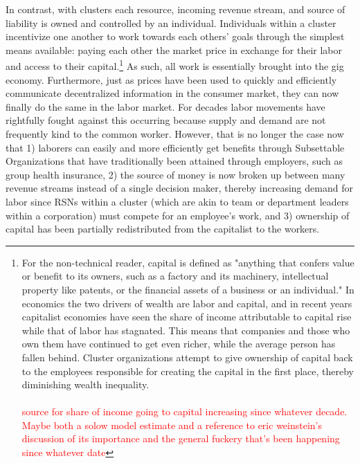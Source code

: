 \documentclass{article}[10pt]
\begin{document}
In contrast, with clusters each resource, incoming revenue stream, and source of liability is owned and controlled by an individual.
Individuals within a cluster incentivize one another to work towards each others' goals through the simplest means available: paying each other the market price in exchange for their labor and access to their capital.\footnote{
    For the non-technical reader, capital is defined as "anything that confers value or benefit to its owners, such as a factory and its machinery, intellectual property like patents, or the financial assets of a business or an individual." In economics the two drivers of wealth are labor and capital, and in recent years capitalist economies have seen the share of income attributable to capital rise while that of labor has stagnated. This means that companies and those who own them have continued to get even richer, while the average person has fallen behind. Cluster organizations attempt to give ownership of capital back to the employees responsible for creating the capital in the first place, thereby diminishing wealth inequality.\\
    \indent \indent {}\\
    \indent \indent \textcolor{red}{source for share of income going to capital increasing since whatever decade. 
    Maybe both a solow model estimate and a reference to eric weinstein's discussion of its importance and the general fuckery that's been happening since whatever date}}
As such, all work is essentially brought into the gig economy.
Furthermore, just as prices have been used to quickly and efficiently communicate decentralized information in the consumer market, they can now finally do the same in the labor market.
For decades labor movements have rightfully fought against this occurring because supply and demand are not frequently kind to the common worker.
However, that is no longer the case now that 1) laborers can easily and more efficiently get benefits through Subsettable Organizations that have traditionally been attained through employers, such as group health insurance, 2) the source of money is now broken up between many revenue streams instead of a single decision maker, thereby increasing demand for labor since RSNs within a cluster (which are akin to team or department leaders within a corporation) must compete for an employee's work, and 3) ownership of capital has been partially redistributed from the capitalist to the workers.\par
\end{document}
